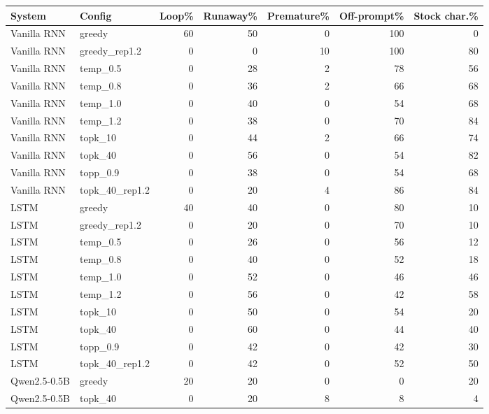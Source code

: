 \begin{tabular}{llrrrrr}
\toprule
System & Config & Loop\% & Runaway\% & Premature\% & Off-prompt\% & Stock char.\% \\
\midrule
Vanilla RNN & greedy & 60 & 50 & 0 & 100 & 0 \\
Vanilla RNN & greedy\_rep1.2 & 0 & 0 & 10 & 100 & 80 \\
Vanilla RNN & temp\_0.5 & 0 & 28 & 2 & 78 & 56 \\
Vanilla RNN & temp\_0.8 & 0 & 36 & 2 & 66 & 68 \\
Vanilla RNN & temp\_1.0 & 0 & 40 & 0 & 54 & 68 \\
Vanilla RNN & temp\_1.2 & 0 & 38 & 0 & 70 & 84 \\
Vanilla RNN & topk\_10 & 0 & 44 & 2 & 66 & 74 \\
Vanilla RNN & topk\_40 & 0 & 56 & 0 & 54 & 82 \\
Vanilla RNN & topp\_0.9 & 0 & 38 & 0 & 54 & 68 \\
Vanilla RNN & topk\_40\_rep1.2 & 0 & 20 & 4 & 86 & 84 \\
LSTM & greedy & 40 & 40 & 0 & 80 & 10 \\
LSTM & greedy\_rep1.2 & 0 & 20 & 0 & 70 & 10 \\
LSTM & temp\_0.5 & 0 & 26 & 0 & 56 & 12 \\
LSTM & temp\_0.8 & 0 & 40 & 0 & 52 & 18 \\
LSTM & temp\_1.0 & 0 & 52 & 0 & 46 & 46 \\
LSTM & temp\_1.2 & 0 & 56 & 0 & 42 & 58 \\
LSTM & topk\_10 & 0 & 50 & 0 & 54 & 20 \\
LSTM & topk\_40 & 0 & 60 & 0 & 44 & 40 \\
LSTM & topp\_0.9 & 0 & 42 & 0 & 42 & 30 \\
LSTM & topk\_40\_rep1.2 & 0 & 42 & 0 & 52 & 50 \\
Qwen2.5-0.5B & greedy & 20 & 20 & 0 & 0 & 20 \\
Qwen2.5-0.5B & topk\_40 & 0 & 20 & 8 & 8 & 4 \\
\bottomrule
\end{tabular}
